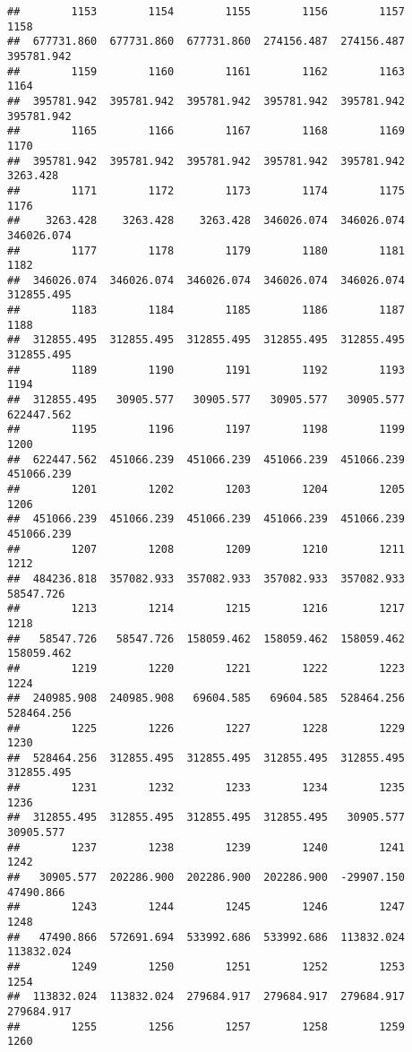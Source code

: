 \documentclass[
]{book}
\begin{document}
\begin{verbatim}
##        1153        1154        1155        1156        1157        1158 
##  677731.860  677731.860  677731.860  274156.487  274156.487  395781.942 
##        1159        1160        1161        1162        1163        1164 
##  395781.942  395781.942  395781.942  395781.942  395781.942  395781.942 
##        1165        1166        1167        1168        1169        1170 
##  395781.942  395781.942  395781.942  395781.942  395781.942    3263.428 
##        1171        1172        1173        1174        1175        1176 
##    3263.428    3263.428    3263.428  346026.074  346026.074  346026.074 
##        1177        1178        1179        1180        1181        1182 
##  346026.074  346026.074  346026.074  346026.074  346026.074  312855.495 
##        1183        1184        1185        1186        1187        1188 
##  312855.495  312855.495  312855.495  312855.495  312855.495  312855.495 
##        1189        1190        1191        1192        1193        1194 
##  312855.495   30905.577   30905.577   30905.577   30905.577  622447.562 
##        1195        1196        1197        1198        1199        1200 
##  622447.562  451066.239  451066.239  451066.239  451066.239  451066.239 
##        1201        1202        1203        1204        1205        1206 
##  451066.239  451066.239  451066.239  451066.239  451066.239  451066.239 
##        1207        1208        1209        1210        1211        1212 
##  484236.818  357082.933  357082.933  357082.933  357082.933   58547.726 
##        1213        1214        1215        1216        1217        1218 
##   58547.726   58547.726  158059.462  158059.462  158059.462  158059.462 
##        1219        1220        1221        1222        1223        1224 
##  240985.908  240985.908   69604.585   69604.585  528464.256  528464.256 
##        1225        1226        1227        1228        1229        1230 
##  528464.256  312855.495  312855.495  312855.495  312855.495  312855.495 
##        1231        1232        1233        1234        1235        1236 
##  312855.495  312855.495  312855.495  312855.495   30905.577   30905.577 
##        1237        1238        1239        1240        1241        1242 
##   30905.577  202286.900  202286.900  202286.900  -29907.150   47490.866 
##        1243        1244        1245        1246        1247        1248 
##   47490.866  572691.694  533992.686  533992.686  113832.024  113832.024 
##        1249        1250        1251        1252        1253        1254 
##  113832.024  113832.024  279684.917  279684.917  279684.917  279684.917 
##        1255        1256        1257        1258        1259        1260 

\end{verbatim}
\end{document}
